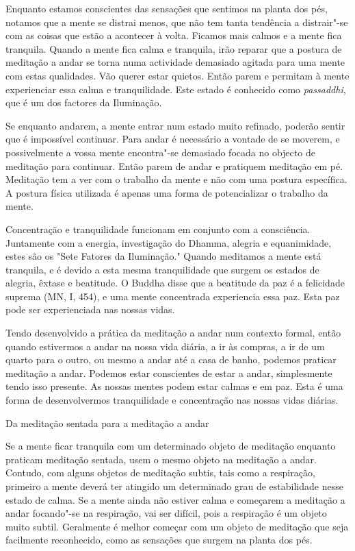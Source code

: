 Enquanto estamos conscientes das sensações que sentimos na planta dos
pés, notamos que a mente se distrai menos, que não tem tanta tendência a
distrair"-se com as coisas que estão a acontecer à volta. Ficamos mais
calmos e a mente fica tranquila. Quando a mente fica calma e tranquila,
irão reparar que a postura de meditação a andar se torna numa actividade
demasiado agitada para uma mente com estas qualidades. Vão querer estar
quietos. Então parem e permitam à mente experienciar essa calma e
tranquilidade. Este estado é conhecido como \emph{passaddhi}, que é um
dos factores da Iluminação.

Se enquanto andarem, a mente entrar num estado muito refinado, poderão
sentir que é impossível continuar. Para andar é necessário a vontade de
se moverem, e possivelmente a vossa mente encontra"-se demasiado focada
no objecto de meditação para continuar. Então parem de andar e pratiquem
meditação em pé. Meditação tem a ver com o trabalho da mente e não com
uma postura específica. A postura física utilizada é apenas uma forma de
potencializar o trabalho da mente.

Concentração e tranquilidade funcionam em conjunto com a consciência.
Juntamente com a energia, investigação do Dhamma, alegria e
equanimidade, estes são os "Sete Fatores da Iluminação."
Quando
meditamos a mente está tranquila, e é devido a esta mesma
tranquilidade que surgem os estados de alegria, êxtase e beatitude. O
Buddha disse que a beatitude da paz é a felicidade suprema (MN, I, 454),
e uma mente concentrada experiencia essa paz. Esta paz pode ser
experienciada nas nossas vidas.

Tendo desenvolvido a prática da meditação a andar num contexto formal,
então quando estivermos a andar na nossa vida diária, a ir às compras, a
ir de um quarto para o outro, ou mesmo a andar até a casa de banho,
podemos praticar meditação a andar. Podemos estar conscientes de estar a
andar, simplesmente tendo isso presente. As nossas mentes podem estar
calmas e em paz. Esta é uma forma de desenvolvermos tranquilidade e
concentração nas nossas vidas diárias.

\begin{siderule-quote}
  Da meditação sentada para a meditação a andar
\end{siderule-quote}

Se a mente ficar tranquila com um determinado objeto de meditação
enquanto praticam meditação sentada, usem o mesmo objeto na meditação a
andar. Contudo, com alguns objetos de meditação subtis, tais como a
respiração, primeiro a mente deverá ter atingido um determinado grau de
estabilidade nesse estado de calma. Se a mente ainda não estiver calma e
começarem a meditação a andar focando"-se na respiração, vai ser difícil,
pois a respiração é um objeto muito subtil. Geralmente é melhor começar
com um objeto de meditação que seja facilmente reconhecido, como as
sensações que surgem na planta dos pés.

